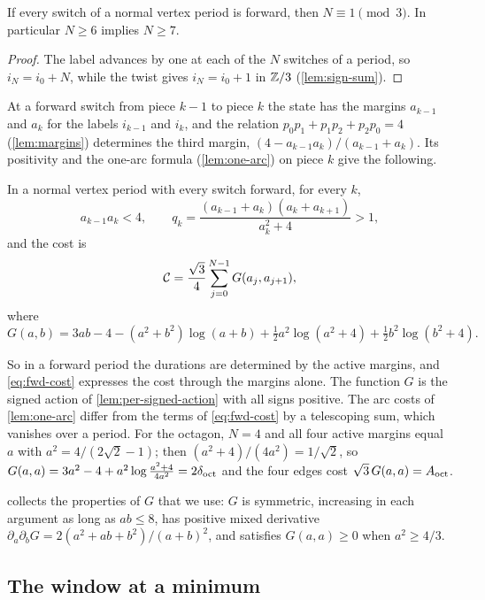 \begin{lemma}\label{lem:fwd-count}
If every switch of a normal vertex period is forward, then $N\equiv1\pmod 3$. In particular
$N\ge6$ implies $N\ge7$.
\end{lemma}

\begin{proof}
The label advances by one at each of the $N$ switches of a period, so $i_N=i_0+N$, while the twist
gives $i_N=i_0+1$ in $\mathbb{Z}/3$ (\cref{lem:sign-sum}).
\end{proof}

At a forward switch from piece $k-1$ to piece $k$ the state has the margins $a_{k-1}$ and $a_k$ for
the labels $i_{k-1}$ and $i_k$, and the relation $p_0p_1+p_1p_2+p_2p_0=4$ (\cref{lem:margins})
determines the third margin, $(4-a_{k-1}a_k)/(a_{k-1}+a_k)$. Its positivity and the one-arc formula
(\cref{lem:one-arc}) on piece $k$ give the following.

\begin{lemma}\label{lem:fwd-cycle}
In a normal vertex period with every switch forward, for every $k$,
\[
a_{k-1}a_k<4,\qquad
q_k=\frac{(a_{k-1}+a_k)(a_k+a_{k+1})}{a_k^2+4}>1,
\]
and the cost is
\begin{equation}\label{eq:fwd-cost}
\mathcal{C}=\frac{\sqrt3}{4}\sum_{j=0}^{N-1}G(a_j,a_{j+1}),
\end{equation}
where
\[
G(a,b)=3ab-4-(a^2+b^2)\log(a+b)+\tfrac12a^2\log(a^2+4)+\tfrac12b^2\log(b^2+4).
\]
\end{lemma}

So in a forward period the durations are determined by the active margins, and
\eqref{eq:fwd-cost} expresses the cost through the margins alone. The function $G$ is the signed
action of \cref{lem:per-signed-action} with all signs positive.
The arc costs of \cref{lem:one-arc} differ from the terms of \eqref{eq:fwd-cost} by a telescoping
sum, which vanishes over a period. For the octagon, $N=4$ and all four active margins equal $a$ with
$a^2=4/(2\sqrt2-1)$; then $(a^2+4)/(4a^2)=1/\sqrt2$, so
$G(a,a)=3a^2-4+a^2\log\frac{a^2+4}{4a^2}=2\delta_{\mathrm{oct}}$ and the four edges cost
$\sqrt3\,G(a,a)=A_{\mathrm{oct}}$.

 collects the properties of $G$ that we use: $G$ is symmetric, increasing in
each argument as long as $ab\le8$, has positive mixed derivative
$\partial_a\partial_bG=2(a^2+ab+b^2)/(a+b)^2$, and satisfies $G(a,a)\ge0$ when $a^2\ge4/3$.

\subsection{The window at a minimum}

